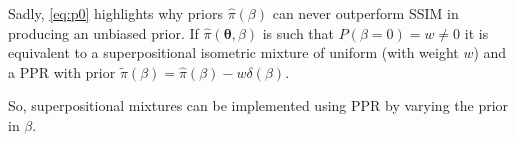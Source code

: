 \documentclass[usenatbib]{mnras}
\begin{document}
Sadly, \cref{eq:p0} highlights why priors $\hat{\pi}(\beta)$ can never
outperform SSIM in producing an unbiased prior. If
$\hat{\pi}(\bm{\theta}, \beta)$ is such that \(P(\beta=0) = w \ne 0\)
it is equivalent to a superpositional isometric mixture of uniform
(with weight \(w\)) and a PPR with prior
$\tilde{\pi}(\beta) = \hat{\pi}(\beta) - w \delta(\beta)$.

So, superpositional mixtures can be implemented using PPR by varying
the prior in $\beta$.
\end{document}
